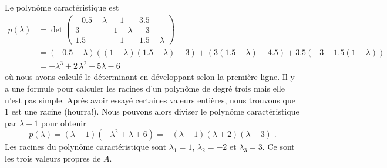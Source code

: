 {\begin{egg}
Le polynôme caractéristique est 
\begin{align*}
p(\lambda) &= \det
\begin{pmatrix}
-0.5-\lambda & -1 & 3.5 \\ 3 & 1-\lambda & -3 \\ 1.5 & -1 & 1.5-\lambda  
\end{pmatrix} \\
&= (-0.5-\lambda)\left( (1-\lambda)(1.5-\lambda) -3 \right)
+ \left( 3(1.5-\lambda)+4.5\right)
+ 3.5\left(-3-1.5(1-\lambda)\right) \\
&= -\lambda^3 + 2\,\lambda^2 + 5 \lambda -6
\end{align*}
où nous avons calculé le déterminant en développant selon la première ligne.
Il y a une formule pour calculer les racines d'un polynôme de degré
trois mais elle n'est pas simple.  Après avoir essayé certaines
valeurs entières, nous trouvons que $1$ est une racine (hourra!).
Nous pouvons alors diviser le polynôme caractéristique par $\lambda-1$
pour obtenir
\[
p(\lambda) = (\lambda-1)(-\lambda^2 + \lambda +6)
=-(\lambda -1)(\lambda+2)(\lambda-3) \; .
\]
Les racines du polynôme caractéristique sont
$\lambda_1=1$, $\lambda_2 = -2$ et $\lambda_3 = 3$. Ce sont les trois
valeurs propres de $A$.


\end{egg}}
